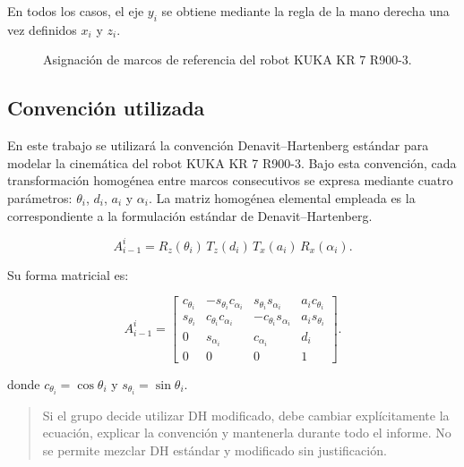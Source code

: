 \documentclass[journal]{IEEEtran}
\newcommand{\instr}[1]{%
\begin{quote}
\small
\noindent\textbf{\color{blue}{INSTRUCCIÓN:}} #1
\end{quote}
}
\begin{document}
En todos los casos, el eje $y_i$ se obtiene mediante la regla de
la mano derecha una vez definidos $x_i$ y $z_i$.

\begin{figure}[H]
    \centering
    \caption{Asignación de marcos de referencia del robot KUKA KR 7 R900-3.}    \label{fig:frames}
\end{figure}

\subsection{Convención utilizada}

En este trabajo se utilizará la convención Denavit--Hartenberg
estándar para modelar la cinemática del robot KUKA KR 7 R900-3.
Bajo esta convención, cada transformación homogénea entre marcos
consecutivos se expresa mediante cuatro parámetros:
$\theta_i$, $d_i$, $a_i$ y $\alpha_i$.
La matriz homogénea elemental empleada es la correspondiente
a la formulación estándar de Denavit--Hartenberg.

\begin{equation}
A_{i-1}^{i} =
R_z(\theta_i)\,
T_z(d_i)\,
T_x(a_i)\,
R_x(\alpha_i).
\label{eq:dh_product}
\end{equation}

Su forma matricial es:

\begin{equation}
A_{i-1}^{i} =
\begin{bmatrix}
c_{\theta_i} & -s_{\theta_i}c_{\alpha_i} & s_{\theta_i}s_{\alpha_i} & a_i c_{\theta_i}\\
s_{\theta_i} & c_{\theta_i}c_{\alpha_i} & -c_{\theta_i}s_{\alpha_i} & a_i s_{\theta_i}\\
0 & s_{\alpha_i} & c_{\alpha_i} & d_i\\
0 & 0 & 0 & 1
\end{bmatrix}.
\label{eq:dh_matrix}
\end{equation}

donde $c_{\theta_i}=\cos\theta_i$ y $s_{\theta_i}=\sin\theta_i$.

\instr{Si el grupo decide utilizar DH modificado, debe cambiar explícitamente la ecuación, explicar la convención y mantenerla durante todo el informe. No se permite mezclar DH estándar y modificado sin justificación.}

\end{document}
